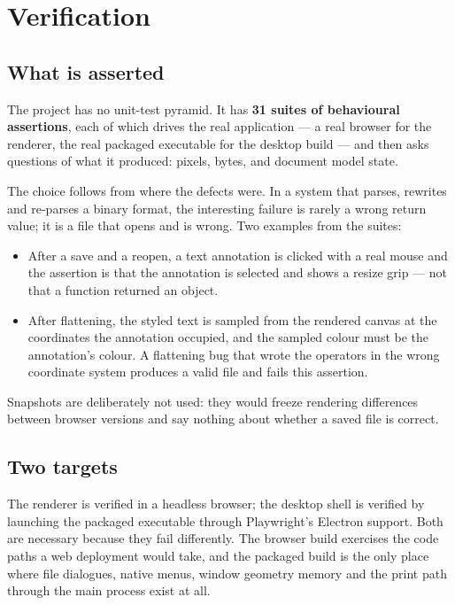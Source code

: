\section{Verification}
\label{sec:verification}

\subsection{What is asserted}

The project has no unit-test pyramid. It has \textbf{31 suites of behavioural assertions},
each of which drives the real application --- a real browser for the renderer, the real
packaged executable for the desktop build --- and then asks questions of what it produced:
pixels, bytes, and document model state.

The choice follows from where the defects were. In a system that parses, rewrites and
re-parses a binary format, the interesting failure is rarely a wrong return value; it is a file
that opens and is wrong. Two examples from the suites:

\begin{itemize}
  \item After a save and a reopen, a text annotation is clicked with a real mouse and the
        assertion is that the annotation is selected and shows a resize grip --- not that a
        function returned an object.
  \item After flattening, the styled text is sampled from the rendered canvas at the
        coordinates the annotation occupied, and the sampled colour must be the annotation's
        colour. A flattening bug that wrote the operators in the wrong coordinate system
        produces a valid file and fails this assertion.
\end{itemize}

Snapshots are deliberately not used: they would freeze rendering differences between browser
versions and say nothing about whether a saved file is correct.

\subsection{Two targets}

The renderer is verified in a headless browser; the desktop shell is verified by launching the
packaged executable through Playwright's Electron support. Both are necessary because they fail
differently. The browser build exercises the code paths a web deployment would take, and the
packaged build is the only place where file dialogues, native menus, window geometry memory and
the print path through the main process exist at all.

